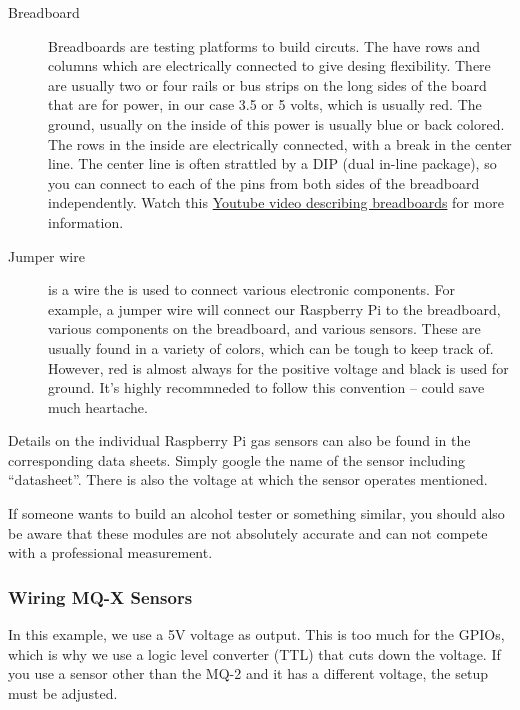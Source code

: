 \documentclass{article}\usepackage[]{graphicx}\usepackage[]{color}
\begin{document}
\begin{description}
\item[Breadboard] Breadboards are testing platforms to build circuts. The have rows and columns which are electrically connected to give desing flexibility. There are usually two or four rails or bus strips on the long sides of the board that are for power, in our case 3.5 or 5 volts, which is usually red. The ground, usually on the inside of this power is usually blue or back colored. The rows in the inside are electrically connected, with a break in the center line. The center line is often strattled by a DIP (dual in-line package), so you can connect to each of the pins from both sides of the breadboard independently. Watch this \href{https://www.google.com/search?q=how+to+breadboards+work&rlz=1C1CHBD_enUS834US834&oq=how+to+breadboards+work&aqs=chrome..69i57j0l3.5628j1j7&sourceid=chrome&ie=UTF-8#kpvalbx=_Gz39Xq2-CuTi9APB3JGYCQ52}{Youtube video describing breadboards} for more information. 
\item[Jumper wire] is a wire the is used to connect various electronic components. For example, a jumper wire will connect our Raspberry Pi to the breadboard, various components on the breadboard, and various sensors. These are usually found in a variety of colors, which can be tough to keep track of. However, red is almost always for the positive voltage and black is used for ground. It's highly recommneded to follow this convention -- could save much heartache.

\end{description}

Details on the individual Raspberry Pi gas sensors can also be found in the corresponding data sheets. Simply google the name of the sensor including ``datasheet''. There is also the voltage at which the sensor operates mentioned.

If someone wants to build an alcohol tester or something similar, you should also be aware that these modules are not absolutely accurate and can not compete with a professional measurement.

\subsubsection{Wiring MQ-X Sensors}

In this example, we use a 5V voltage as output. This is too much for the GPIOs, which is why we use a logic level converter (TTL) that cuts down the voltage. If you use a sensor other than the MQ-2 and it has a different voltage, the setup must be adjusted.
\end{document}
